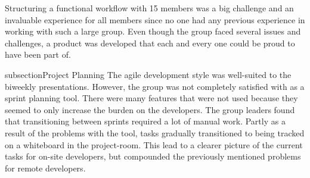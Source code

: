 Structuring a functional workflow with 15 members was a big challenge and an invaluable experience for all members since no one had any previous experience in working with such a large group. Even though the group faced several issues and challenges, a product was developed that each and every one could be proud to have been part of.

subsection{Project Planning}
The agile development style was well-suited to the biweekly presentations. However, the group was not completely satisfied with \taiga{} as a sprint planning tool. There were many features that were not used because they seemed to only increase the burden on the developers. The group leaders found that transitioning between sprints required a lot of manual work. Partly as a result of the problems with the tool, tasks gradually transitioned to being tracked on a whiteboard in the project-room. This lead to a clearer picture of the current tasks for on-site developers, but compounded the previously mentioned problems for remote developers.
